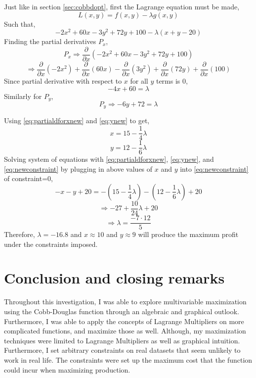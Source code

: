 \documentclass[a4paper,12pt]{article}
\theoremstyle{definition}
\begin{document}
Just like in section \ref{sec:cobbdopt}, first the Lagrange equation must be made,
\begin{equation}
	L(x,y)=f(x,y)-\lambda g(x,y)
\end{equation}
Such that,
\begin{equation}
	-2x^2 +60x -3y^2 +72y +100 - \lambda (x+y-20)
\end{equation}
Finding the partial derivatives $P_x$,
\begin{equation}
	P_x \Rightarrow \frac{\partial}{\partial x}(-2x^2 +60x -3y^2 +72y +100)
\end{equation}
\begin{equation}
	\Rightarrow \frac{\partial}{\partial x}(-2x^2)+\frac{\partial}{\partial x}(60x)-\frac{\partial}{\partial x}(3y^2)+\frac{\partial}{\partial x}(72y)+\frac{\partial}{\partial x}(100)
\end{equation}
Since partial derivative with respect to $x$ for all $y$ terms is $0$,
\begin{equation}\label{eq:partialdforxnew}
	-4x+60=\lambda
\end{equation}
Similarly for $P_y$,
\begin{equation}\label{eq:ynew}
	P_y \Rightarrow -6y+72=\lambda
\end{equation}

Using \eqref{eq:partialdforxnew} and \eqref{eq:ynew} to get,
\begin{equation}
	x=15-\frac{1}{4}\lambda
\end{equation}
\begin{equation}
	y=12-\frac{1}{6}\lambda
\end{equation}
Solving system of equations with \eqref{eq:partialdforxnew}, \eqref{eq:ynew}, and \eqref{eq:newconstraint} by plugging in above values of $x$ and $y$ into \eqref{eq:newconstraint} of constraint=0,
\begin{equation}
	-x-y+20=-(15-\frac{1}{4}\lambda)-(12-\frac{1}{6}\lambda)+20
\end{equation}
\begin{equation}
	\Rightarrow -27 +\frac{10}{24}\lambda+20
\end{equation}
\begin{equation}
	\Rightarrow \lambda = \frac{-7\cdot 12}{5}
\end{equation}
Therefore, $\lambda=-16.8$ and $x \approx 10$ and $y \approx 9$ will produce the maximum profit under the constraints imposed. 

\newpage
\section{Conclusion and closing remarks}
Throughout this investigation, I was able to explore multivariable maximization using the Cobb-Douglas function through an algebraic and graphical outlook. Furthermore, I was able to apply the concepts of Lagrange Multipliers on more complicated functions, and maximize those as well. Although, my maximization techniques were limited to Lagrange Multipliers as well as graphical intuition. Furthermore, I set arbitrary constraints on real datasets that seem unlikely to work in real life. The constraints were set up the maximum cost that the function could incur when maximizing production. 
\end{document}
